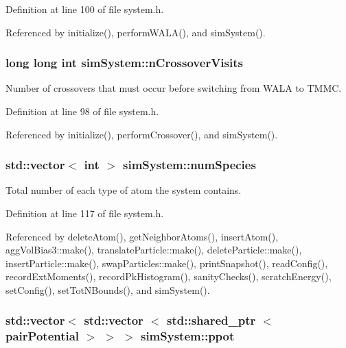 Definition at line 100 of file system.\-h.



Referenced by initialize(), perform\-W\-A\-L\-A(), and sim\-System().

\hypertarget{classsim_system_aa748f651ddd9a2bf6d88bfcab9153905}{
\subsubsection[{n\-Crossover\-Visits}]{\setlength{\rightskip}{0pt plus 5cm}long long int sim\-System\-::n\-Crossover\-Visits}}\label{classsim_system_aa748f651ddd9a2bf6d88bfcab9153905}


Number of crossovers that must occur before switching from W\-A\-L\-A to T\-M\-M\-C. 



Definition at line 98 of file system.\-h.



Referenced by initialize(), perform\-Crossover(), and sim\-System().

\hypertarget{classsim_system_a9eea865e6dc1cff377b1e79c4d9c23f0}{
\subsubsection[{num\-Species}]{\setlength{\rightskip}{0pt plus 5cm}std\-::vector$<$ int $>$ sim\-System\-::num\-Species}}\label{classsim_system_a9eea865e6dc1cff377b1e79c4d9c23f0}


Total number of each type of atom the system contains. 



Definition at line 117 of file system.\-h.



Referenced by delete\-Atom(), get\-Neighbor\-Atoms(), insert\-Atom(), agg\-Vol\-Bias3\-::make(), translate\-Particle\-::make(), delete\-Particle\-::make(), insert\-Particle\-::make(), swap\-Particles\-::make(), print\-Snapshot(), read\-Config(), record\-Ext\-Moments(), record\-Pk\-Histogram(), sanity\-Checks(), scratch\-Energy(), set\-Config(), set\-Tot\-N\-Bounds(), and sim\-System().

\hypertarget{classsim_system_ad2e290b5963f132e6a3a56cee35c8e9f}{
\subsubsection[{ppot}]{\setlength{\rightskip}{0pt plus 5cm}std\-::vector$<$ std\-::vector $<$ std\-::shared\-\_\-ptr $<$ {\bf pair\-Potential} $>$ $>$ $>$ sim\-System\-::ppot}}\label{classsim_system_ad2e290b5963f132e6a3a56cee35c8e9f}


